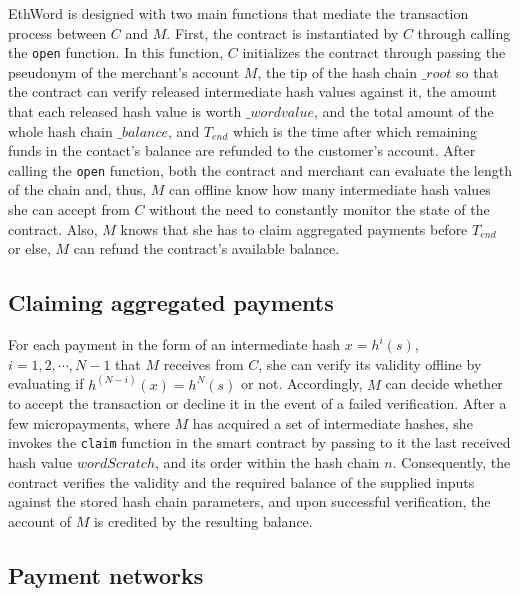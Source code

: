 
EthWord is designed with two main functions that mediate the transaction process between $C$ and $M$. First, the contract is instantiated by $C$ through calling the \texttt{open} function. In this function, $C$ initializes the contract through passing the pseudonym of the merchant's account $M$, the tip of the hash chain $\_root$ so that the contract can verify released intermediate hash values against it, the amount that each released hash value is worth $\_wordvalue$, and the total amount of the whole hash chain $\_balance$, and $T_{end}$ which is the time after which remaining funds in the contact's balance are refunded to the customer's account. After calling the \texttt{open} function, both the contract and merchant can evaluate the length of the chain and, thus, $M$ can offline know how many intermediate hash values she can accept from $C$ without the need to constantly monitor the state of the contract. Also, $M$ knows that she has to claim aggregated payments before $T_{end}$ or else, $M$ can refund the contract's available balance.

\subsection{Claiming aggregated payments} 

For each payment in the form of an intermediate hash $x=h^i(s)$, $i=1,2,\cdots,N-1$ that $M$ receives from $C$, she can verify its validity offline by evaluating if $h^{(N-i)}(x) = h^N(s)$ or not. Accordingly, $M$ can decide whether to accept the transaction or decline it in the event of a failed verification. After a few micropayments, where $M$ has acquired a set of intermediate hashes, she invokes the \texttt{claim} function in the smart contract by passing to it the last received hash value $wordScratch$, and its order within the hash chain $n$. Consequently, the contract verifies the validity and the required balance of the supplied inputs against the stored hash chain parameters, and upon successful verification, the account of $M$ is credited by the resulting balance.

\subsection{Payment networks} 



